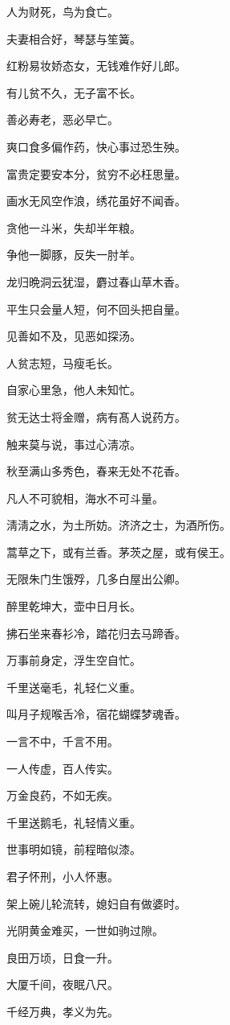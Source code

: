 \documentclass[12pt,oneside]{book}
\begin{document}
人为财死，鸟为食亡。

夫妻相合好，琴瑟与笙簧。

红粉易妆娇态女，无钱难作好儿郎。

有儿贫不久，无子富不长。

善必寿老，恶必早亡。

爽口食多偏作药，快心事过恐生殃。

富贵定要安本分，贫穷不必枉思量。

画水无风空作浪，绣花虽好不闻香。

贪他一斗米，失却半年粮。

争他一脚豚，反失一肘羊。

龙归晩洞云犹湿，麝过春山草木香。

平生只会量人短，何不回头把自量。

见善如不及，见恶如探汤。

人贫志短，马瘦毛长。

自家心里急，他人未知忙。

贫无达士将金赠，病有髙人说药方。

触来莫与说，事过心淸凉。

秋至满山多秀色，春来无处不花香。

凡人不可貌相，海水不可斗量。

淸淸之水，为土所妨。济济之士，为酒所伤。

蒿草之下，或有兰香。茅茨之屋，或有侯王。

无限朱门生饿殍，几多白屋出公卿。

醉里乾坤大，壶中日月长。

拂石坐来春衫冷，踏花归去马蹄香。

万事前身定，浮生空自忙。

千里送毫毛，礼轻仁义重。

叫月子规喉舌冷，宿花蝴蝶梦魂香。

一言不中，千言不用。

一人传虚，百人传实。

万金良药，不如无疾。

千里送鹅毛，礼轻情义重。

世事明如镜，前程暗似漆。

君子怀刑，小人怀惠。

架上碗儿轮流转，媳妇自有做婆时。

光阴黄金难买，一世如驹过隙。

良田万顷，日食一升。

大厦千间，夜眠八尺。

千经万典，孝义为先。
\end{document}
